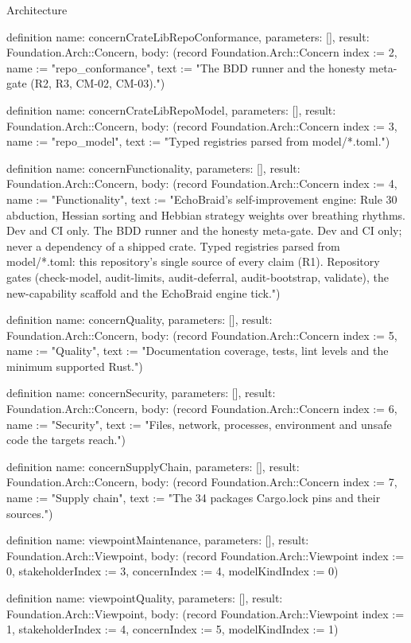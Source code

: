 \begin{lexlean}{Architecture}
\begin{semanticmodule}
definition{
  name: concernCrateLibRepoConformance,
  parameters: [],
  result: Foundation.Arch::Concern,
  body: (record Foundation.Arch::Concern {index := 2, name := "repo_conformance", text := "The BDD runner and the honesty meta-gate (R2, R3, CM-02, CM-03)."})
}

definition{
  name: concernCrateLibRepoModel,
  parameters: [],
  result: Foundation.Arch::Concern,
  body: (record Foundation.Arch::Concern {index := 3, name := "repo_model", text := "Typed registries parsed from model/*.toml."})
}

definition{
  name: concernFunctionality,
  parameters: [],
  result: Foundation.Arch::Concern,
  body: (record Foundation.Arch::Concern {index := 4, name := "Functionality", text := "EchoBraid's self-improvement engine: Rule 30 abduction, Hessian sorting and Hebbian strategy weights over breathing rhythms. Dev and CI only. The BDD runner and the honesty meta-gate. Dev and CI only; never a dependency of a shipped crate. Typed registries parsed from model/*.toml: this repository's single source of every claim (R1). Repository gates (check-model, audit-limits, audit-deferral, audit-bootstrap, validate), the new-capability scaffold and the EchoBraid engine tick."})
}

definition{
  name: concernQuality,
  parameters: [],
  result: Foundation.Arch::Concern,
  body: (record Foundation.Arch::Concern {index := 5, name := "Quality", text := "Documentation coverage, tests, lint levels and the minimum supported Rust."})
}

definition{
  name: concernSecurity,
  parameters: [],
  result: Foundation.Arch::Concern,
  body: (record Foundation.Arch::Concern {index := 6, name := "Security", text := "Files, network, processes, environment and unsafe code the targets reach."})
}

definition{
  name: concernSupplyChain,
  parameters: [],
  result: Foundation.Arch::Concern,
  body: (record Foundation.Arch::Concern {index := 7, name := "Supply chain", text := "The 34 packages Cargo.lock pins and their sources."})
}

definition{
  name: viewpointMaintenance,
  parameters: [],
  result: Foundation.Arch::Viewpoint,
  body: (record Foundation.Arch::Viewpoint {index := 0, stakeholderIndex := 3, concernIndex := 4, modelKindIndex := 0})
}

definition{
  name: viewpointQuality,
  parameters: [],
  result: Foundation.Arch::Viewpoint,
  body: (record Foundation.Arch::Viewpoint {index := 1, stakeholderIndex := 4, concernIndex := 5, modelKindIndex := 1})
}


\end{semanticmodule}
\end{lexlean}
